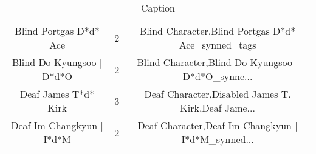 \begin{table}[h!]
{\begin{tabular}{|c|c|c|}
                            Blind Portgas D*d* Ace &          2 & Blind Character,Blind Portgas D*d* Ace\_synned\_tags \\
                         Blind Do Kyungsoo | D*d*O &          2 & Blind Character,Blind Do Kyungsoo | D*d*O\_synne... \\
                              Deaf James T*d* Kirk &          3 & Deaf Character,Disabled James T. Kirk,Deaf Jame... \\
                         Deaf Im Changkyun | I*d*M &          2 & Deaf Character,Deaf Im Changkyun | I*d*M\_synned... \\
\hline
\end{tabular}}
 \caption{Caption}
 \label{tab:my_label}
\end{table}
